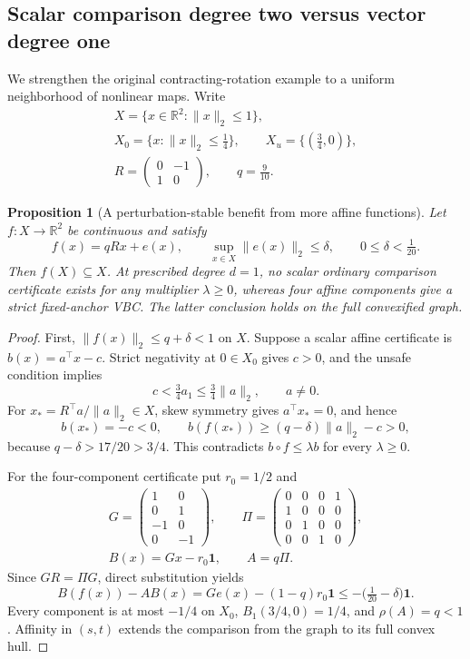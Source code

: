 \documentclass[journal,10pt]{IEEEtran}
\newtheorem{proposition}{Proposition}
\theoremstyle{definition}\newtheorem{definition}{Definition}
\theoremstyle{remark}
\newcommand{\R}{\mathbb R}
\newcommand{\one}{\mathbf 1}
\begin{document}
\subsection{Scalar comparison degree two versus vector degree one}\label{sec:adding}
We strengthen the original contracting-rotation example to a uniform neighborhood of nonlinear maps. Write
\[
\begin{gathered}
 X=\{x\in\R^2:\|x\|_2\leq1\},\\
 X_0=\{x:\|x\|_2\leq\tfrac14\},\qquad X_u=\{(\tfrac34,0)\},\\
 R=\begin{pmatrix}0&-1\\1&0\end{pmatrix},\qquad q=\tfrac9{10}.
\end{gathered}
\]
\begin{proposition}[A perturbation-stable benefit from more affine functions]\label{prop:nonlinear}
Let $f:X\to\R^2$ be continuous and satisfy
\[
 f(x)=qRx+e(x),\qquad \sup_{x\in X}\|e(x)\|_2\leq\delta,\qquad 0\leq\delta<\tfrac1{20}.
\]
Then $f(X)\subseteq X$. At prescribed degree $d=1$, no scalar ordinary comparison certificate exists for any multiplier $\lambda\geq0$, whereas four affine components give a strict fixed-anchor VBC. The latter conclusion holds on the full convexified graph.
\end{proposition}
\begin{proof}
First, $\|f(x)\|_2\leq q+\delta<1$ on $X$.
Suppose a scalar affine certificate is $b(x)=a^\top x-c$.
Strict negativity at $0\in X_0$ gives $c>0$, and the unsafe condition implies
\[
 c<\tfrac34a_1\leq\tfrac34\|a\|_2,\qquad a\neq0.
\]
For $x_*=R^\top a/\|a\|_2\in X$, skew symmetry gives $a^\top x_*=0$, and hence
\[
 b(x_*)=-c<0,\qquad
 b(f(x_*))\geq(q-\delta)\|a\|_2-c>0,
\]
because $q-\delta>17/20>3/4$. This contradicts
$b\circ f\leq\lambda b$ for every $\lambda\geq0$.

For the four-component certificate put $r_0=1/2$ and
\[
\begin{gathered}
 G=\begin{pmatrix}1&0\\0&1\\-1&0\\0&-1\end{pmatrix},\qquad
 \Pi=\begin{pmatrix}0&0&0&1\\1&0&0&0\\0&1&0&0\\0&0&1&0\end{pmatrix},\\
 B(x)=Gx-r_0\one,\qquad A=q\Pi.
\end{gathered}
\]
Since $GR=\Pi G$, direct substitution yields
\[
 B(f(x))-AB(x)=Ge(x)-(1-q)r_0\one
 \leq-\bigl(\tfrac1{20}-\delta\bigr)\one.
\]
Every component is at most $-1/4$ on $X_0$, $B_1(3/4,0)=1/4$,
and $\rho(A)=q<1$. Affinity in $(s,t)$ extends the comparison from the graph to its full convex hull.
\end{proof}
\end{document}
